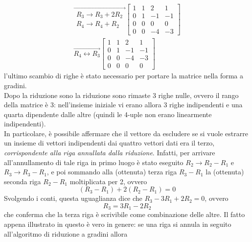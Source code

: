 \begin{defi}
\begin{equation}
\begin{matrix}
      \overrightarrow{
      \begin{matrix}
        R_3\to R_3+2R_2\\
        R_4\to R_4+R_2
      \end{matrix}
      }
      \begin{bmatrix}
        1 & 1 & 2 & 1\\
        0 & 1 & -1 & -1\\
        0 & 0 & 0 & 0\\
        0 & 0 & -4 & -3
      \end{bmatrix}\\
      \overrightarrow{
      R_4\leftrightarrow R_3}
      \begin{bmatrix}
        1 & 1 & 2 & 1\\
        0 & 1 & -1 & -1 \\
        0 & 0 & -4 & -3\\
        0 & 0 & 0 & 0
      \end{bmatrix}
    \end{matrix}
  \end{equation}
  l'ultimo scambio di righe è stato necessario per portare la matrice
  nella forma a gradini.\\
  Dopo la riduzione sono la riduzione sono rimaste 3 righe nulle, ovvero
  il rango della matrice è 3: nell'insieme iniziale vi erano allora 3
  righe indipendenti e una quarta dipendente dalle altre (quindi le
  4-uple non erano linearmente indipendenti).\\
  In particolare, è possibile affermare che il vettore da escludere se
  si vuole estrarre un insieme di vettori indipendenti dai quattro
  vettori dati era il terzo, \textit{corrispondente alla riga annullata
    dalla riduzione}. Infatti, per arrivare all'annullamento di tale riga
  in primo luogo è stato eseguito $R_2\to R_2-R_1$ e $R_3\to R_3-R_1$, e
  poi sommando alla (ottenuta) terza riga $R_3-R_1$ la (ottenuta) seconda
  riga $R_2-R_1$ moltiplicata per 2, ovvero
  \begin{equation*}
    (R_3-R_1)+2(R_2-R_1)=0
  \end{equation*}
  Svolgendo i conti, questa uguaglianza dice che $R_3-3R_1+2R_2=0$, ovvero
  \begin{equation*}
    R_3=3R_1-2R_2
  \end{equation*}
  che conferma che la terza riga è scrivibile come combinazione delle
  altre. Il fatto appena illustrato in questo è vero in genere: se una
  riga si annula in seguito all'algoritmo di riduzione a gradini allora

\end{defi}
